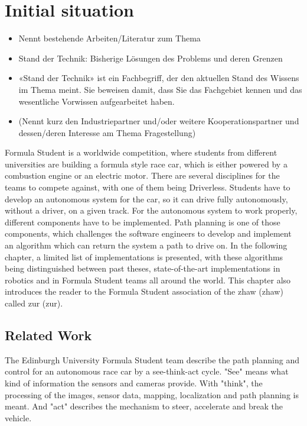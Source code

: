 \section{Initial situation}
\begin{itemize}
    \item Nennt bestehende Arbeiten/Literatur zum Thema
    \item Stand der Technik: Bisherige Lösungen des Problems und deren Grenzen
    \item «Stand der Technik» ist ein Fachbegriff, der den aktuellen Stand des Wissens im Thema meint. Sie beweisen damit, dass Sie das Fachgebiet kennen und das wesentliche Vorwissen aufgearbeitet haben.
    \item (Nennt kurz den Industriepartner und/oder weitere Kooperationspartner und dessen/deren Interesse am Thema Fragestellung)
\end{itemize}
Formula Student is a worldwide competition, where students from different universities are building a formula style race car, which is either powered by a combustion engine or an electric motor. There are several disciplines for the teams to compete against, with one of them being Driverless. Students have to develop an autonomous system for the car, so it can drive fully autonomously, without a driver, on a given track. For the autonomous system to work properly, different components have to be implemented. Path planning is one of those components, which challenges the software engineers to develop and implement an algorithm which can return the system a path to drive on. In the following chapter, a limited list of implementations is presented, with these algorithms being distinguished between past theses, state-of-the-art implementations in robotics and in Formula Student teams all around the world. This chapter also introduces the reader to the Formula Student association of the \acrlong{zhaw} (\acrshort{zhaw}) called \acrlong{zur} (\acrshort{zur}).

\subsection{Related Work}
The Edinburgh University Formula Student team describe the path planning and control for an autonomous race car by a see-think-act cycle. "See" means what kind of information the sensors and cameras provide. With "think", the processing of the images, sensor data, mapping, localization and path planning is meant. And "act" describes the mechanism to steer, accelerate and break the vehicle.

